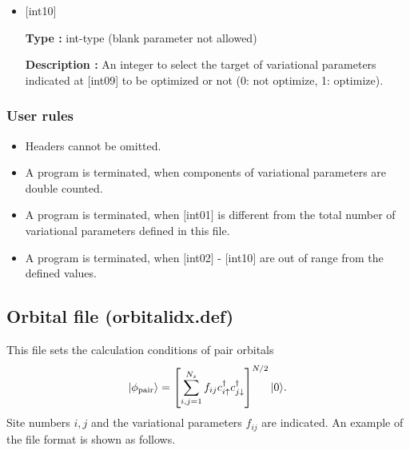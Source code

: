 \begin{itemize}
  {\bf Description :} 
  An integer giving kinds of variational  parameters. The value is $(2n+s)\times$[int01]$+t$, where $n$, $s$ and $t$ are given by the following relation:
  \begin{itemize}
  \item{$n$}: The number of doublon (holon) around the center site (0, 1, 2, 3, 4),  \\
  \item{$s$}: When the center is doublon (holon), s=0 (1), \\
  \item{$t$}: The kind of variational parameters (0, $\cdots$ [int1]-1).
  \end{itemize}  
  
 \item  $[$int10$]$
   
   {\bf Type :} int-type (blank parameter not allowed)

  {\bf Description :} An integer to select the target of variational parameters indicated at [int09] to be optimized or not (0: not optimize, 1: optimize).
  
\end{itemize}

\subsubsection{User rules}
\begin{itemize}
\item Headers cannot be omitted. 
\item A program is terminated, when components of variational parameters are double counted.
\item A program is terminated, when $[$int01$]$ is different from the total number of variational parameters defined in this file.
\item A program is terminated, when $[$int02$]$ - $[$int10$]$ are out of range from the defined values.
\end{itemize}

\newpage
\subsection{Orbital file (orbitalidx.def)}
\label{Subsec:Orbital}
This file sets the calculation conditions of pair orbitals
\begin{equation}
|\phi_{\rm pair} \rangle = \left[\sum_{i, j=1}^{N_s} f_{ij}c_{i\uparrow}^{\dag}c_{j\downarrow}^{\dag} \right]^{N/2}|0 \rangle.
\end{equation}
Site numbers $i, j$ and the variational parameters $f_{ij}$ are indicated.
An example of the file format is shown as follows.

